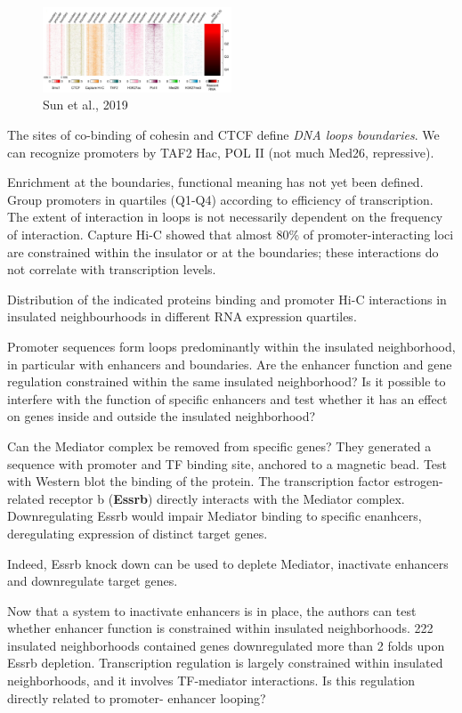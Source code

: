 \begin{figure}
\centering
\includegraphics[width=0.5\textwidth]{../_resources/Screenshot_2022-10-19_at_10-01-09.png}
\caption{Sun et al., 2019}
\end{figure}


The sites of co-binding of cohesin and CTCF define \emph{DNA loops boundaries}. We can recognize promoters by TAF2 Hac, POL II (not much Med26, repressive).

Enrichment at the boundaries, functional meaning has not yet been defined. Group promoters in quartiles (Q1-Q4) according to efficiency of transcription. The extent of interaction in loops is not necessarily dependent on the frequency of interaction. Capture Hi-C showed that almost 80\% of promoter-interacting loci are constrained within the insulator or at the boundaries; these interactions do not correlate with transcription levels.

Distribution of the indicated proteins binding and promoter Hi-C interactions in insulated neighbourhoods in different RNA expression quartiles.

Promoter sequences form loops predominantly within the insulated neighborhood, in particular with enhancers and boundaries. Are the enhancer function and gene regulation constrained within the same insulated neighborhood? Is it possible to interfere with the function of specific enhancers and test whether it has an effect on genes inside and outside the insulated neighborhood?

Can the Mediator complex be removed from specific genes? They generated a sequence with promoter and TF binding site, anchored to a magnetic bead. Test with Western blot the binding of the protein. The transcription factor estrogen-related receptor b (\textbf{Essrb}) directly interacts with the Mediator complex. Downregulating Essrb would impair Mediator binding to specific enanhcers, deregulating expression of distinct target genes.

Indeed, Essrb knock down can be used to deplete Mediator, inactivate enhancers and downregulate target genes.

Now that a system to inactivate enhancers is in place, the authors can test whether enhancer function is constrained within insulated neighborhoods. 222 insulated neighborhoods contained genes downregulated more than 2 folds upon Essrb depletion. Transcription regulation is largely constrained within insulated neighborhoods, and it involves TF-mediator interactions. Is this regulation directly related to promoter- enhancer looping?

